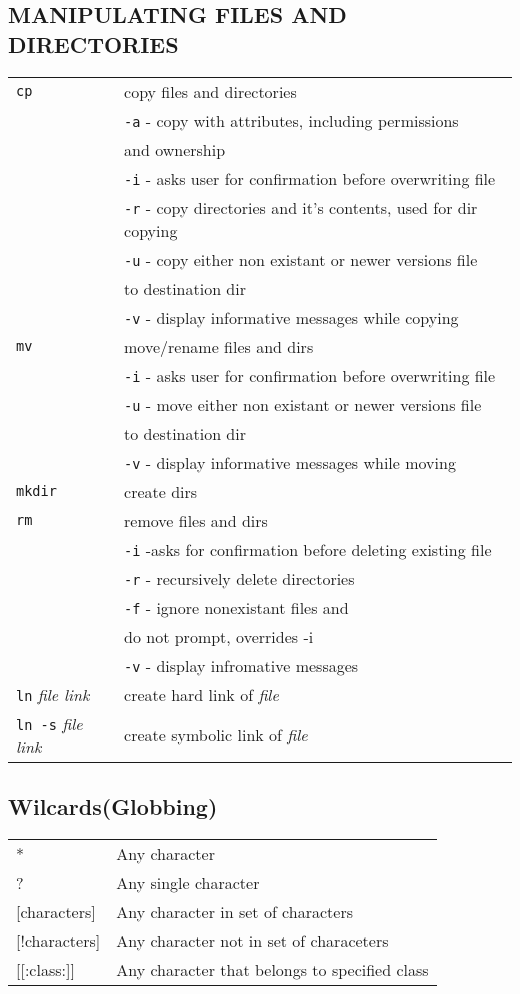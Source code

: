 \documentclass[8pt]{extarticle}
\begin{document}
\begin{multicols}{2}
\section{MANIPULATING FILES AND DIRECTORIES}

\begin{tabular}{ll}
\texttt{cp} & copy files and directories\\
& \texttt{-a} - copy with attributes, including permissions \\
& and ownership\\
& \texttt{-i} - asks user for confirmation before overwriting file\\
& \texttt{-r} - copy directories and it's contents, used for dir copying\\
& \texttt{-u} - copy either non existant or newer versions file\\ 
& to destination dir\\
& \texttt{-v} - display informative messages while copying\\
\texttt{mv} & move/rename files and dirs\\
& \texttt{-i} - asks user for confirmation before overwriting file\\
& \texttt{-u} - move either non existant or newer versions file\\
& to destination dir\\
& \texttt{-v} - display informative messages while moving\\ \texttt{mkdir} & create dirs\\ \texttt{rm} & remove files and dirs\\
& \texttt{-i} -asks for confirmation before deleting existing file\\
& \texttt{-r} - recursively delete directories\\
& \texttt{-f} - ignore nonexistant files and\\
& do not prompt, overrides -i\\
& \texttt{-v} - display infromative messages\\
\texttt{ln} \textit{file link} & create hard link of \textit{file}\\
\texttt{ln -s} \textit{file link} & create symbolic link of \textit{file}\\
\end{tabular}

\subsection{Wilcards(Globbing)}
\begin{tabular}{ll}
* & Any character\\
? & Any single character\\
{[characters]} & Any character in set of characters\\
{[!characters]} & Any character not in set of characeters\\
{[[:class:]]} & Any character that belongs to specified class\\
\end{tabular}


\end{multicols}
\end{document}
